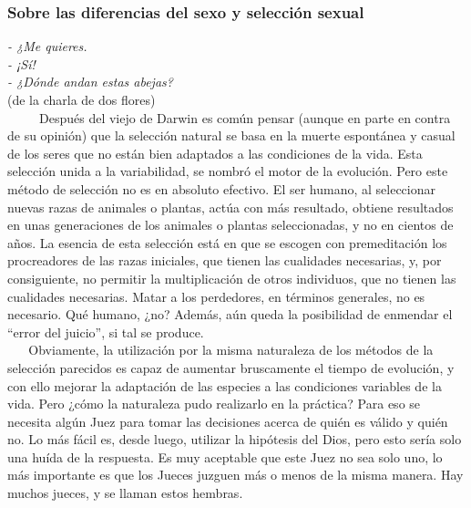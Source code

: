 \protect\hypertarget{M4}{}{}

\subsubsection{Sobre las diferencias del sexo y selección sexual}\label{sobre-las-diferencias-del-sexo-y-selecciuxf3n-sexual}

\noindent
\textit{- ¿Me quieres.}\\
\textit{- ¡Sí!}\\
\textit{- ¿Dónde andan estas abejas?}\\
(de la charla de dos flores)\\



~ ~ ~ Después del viejo de Darwin es común pensar (aunque en parte en
contra de su opinión) que la selección natural se basa en la muerte
espontánea y casual de los seres que no están bien adaptados a las
condiciones de la vida. Esta selección unida a la variabilidad, se
nombró el motor de la evolución. Pero este método de selección no es en
absoluto efectivo. El ser humano, al seleccionar nuevas razas de
animales o plantas, actúa con más resultado, obtiene resultados en unas
generaciones de los animales o plantas seleccionadas, y no en cientos de
años. La esencia de esta selección está en que se escogen con
premeditación los procreadores de las razas iniciales, que tienen las
cualidades necesarias, y, por consiguiente, no permitir la
multiplicación de otros individuos, que no tienen las cualidades
necesarias. Matar a los perdedores, en términos generales, no es
necesario. Qué humano, ¿no? Además, aún queda la posibilidad de enmendar
el ``error del juicio'', si tal se produce.\\
\hspace*{0.333em} ~ ~ Obviamente, la utilización por la misma naturaleza
de los métodos de la selección parecidos es capaz de aumentar
bruscamente el tiempo de evolución, y con ello mejorar la adaptación de
las especies a las condiciones variables de la vida. Pero ¿cómo la
naturaleza pudo realizarlo en la práctica? Para eso se necesita algún
Juez para tomar las decisiones acerca de quién es válido y quién no. Lo
más fácil es, desde luego, utilizar la hipótesis del Dios, pero esto
sería solo una huída de la respuesta. Es muy aceptable que este Juez no
sea solo uno, lo más importante es que los Jueces juzguen más o menos de
la misma manera. Hay muchos jueces, y se llaman estos hembras.
